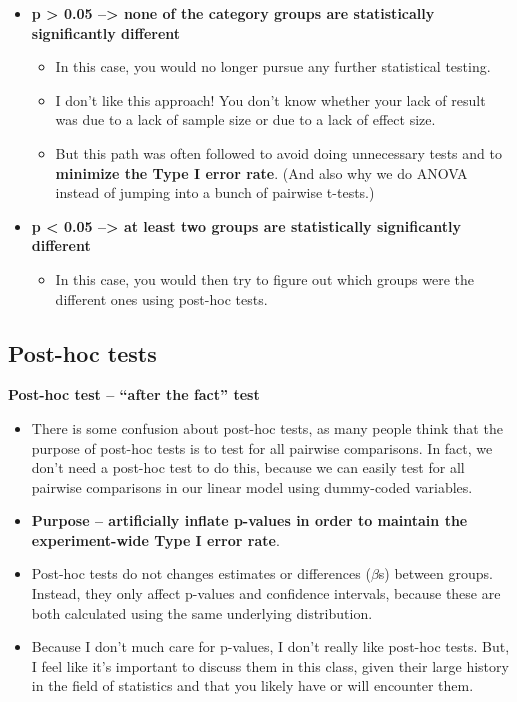 \documentclass[
]{article}
\providecommand{\tightlist}{%
  \setlength{\itemsep}{0pt}\setlength{\parskip}{0pt}}
\begin{document}
\begin{itemize}
\tightlist
\item
  \textbf{p \textgreater{} 0.05 --\textgreater{} none of the category
  groups are statistically significantly different}

  \begin{itemize}
  \tightlist
  \item
    In this case, you would no longer pursue any further statistical
    testing.
  \item
    I don't like this approach! You don't know whether your lack of
    result was due to a lack of sample size or due to a lack of effect
    size.
  \item
    But this path was often followed to avoid doing unnecessary tests
    and to \textbf{minimize the Type I error rate}. (And also why we do
    ANOVA instead of jumping into a bunch of pairwise t-tests.)
  \end{itemize}
\item
  \textbf{p \textless{} 0.05 --\textgreater{} at least two groups are
  statistically significantly different}

  \begin{itemize}
  \tightlist
  \item
    In this case, you would then try to figure out which groups were the
    different ones using post-hoc tests.
  \end{itemize}
\end{itemize}

\subsection{Post-hoc tests}\label{post-hoc-tests}

\textbf{Post-hoc test -- ``after the fact'' test}

\begin{itemize}
\tightlist
\item
  There is some confusion about post-hoc tests, as many people think
  that the purpose of post-hoc tests is to test for all pairwise
  comparisons. In fact, we don't need a post-hoc test to do this,
  because we can easily test for all pairwise comparisons in our linear
  model using dummy-coded variables.
\item
  \textbf{Purpose -- artificially inflate p-values in order to maintain
  the experiment-wide Type I error rate}.
\item
  Post-hoc tests do not changes estimates or differences (\(\beta\)s)
  between groups. Instead, they only affect p-values and confidence
  intervals, because these are both calculated using the same underlying
  distribution.
\item
  Because I don't much care for p-values, I don't really like post-hoc
  tests. But, I feel like it's important to discuss them in this class,
  given their large history in the field of statistics and that you
  likely have or will encounter them.
\end{itemize}
\end{document}
